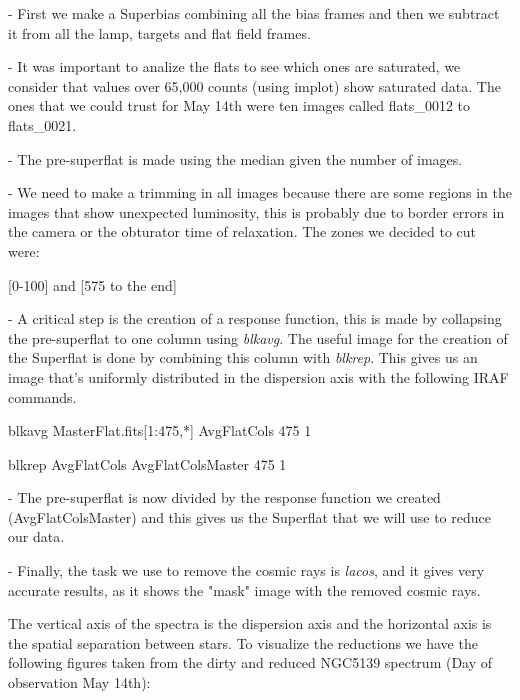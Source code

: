 - First we make a Superbias combining all the bias frames and then we subtract it from all the lamp, targets and flat field frames.

- It was important to analize the flats to see which ones are saturated, we consider that values over 65,000 counts (using implot) show saturated data. The ones that we could trust for May 14th were ten images called flats\_0012 to flats\_0021.

- The pre-superflat is made using the median given the number of images.

- We need to make a trimming in all images because there are some regions in the images that show unexpected luminosity, this is probably due to border errors in the camera or the obturator time of relaxation. The zones we decided to cut were:

[0-100] and [575 to the end]

- A critical step is the creation of a response function, this is made by collapsing the pre-superflat to one column using \textit{blkavg}. The useful image for the creation of the Superflat is done by combining this column with \textit{blkrep}. This gives us an image that's uniformly distributed in the dispersion axis with the following IRAF commands.

blkavg MasterFlat.fits[1:475,*] AvgFlatCols 475 1

blkrep AvgFlatCols AvgFlatColsMaster 475 1

- The pre-superflat is now divided by the response function we created (AvgFlatColsMaster) and this gives us the Superflat that we will use to reduce our data.

- Finally, the task we use to remove the cosmic rays is \textit{lacos}, and it gives very accurate results, as it shows the "mask" image with the removed cosmic rays.

The vertical axis of the spectra is the dispersion axis and the horizontal axis is the spatial separation between stars. To visualize the reductions we have the following figures taken from the dirty and reduced NGC5139 spectrum (Day of observation May 14th):

